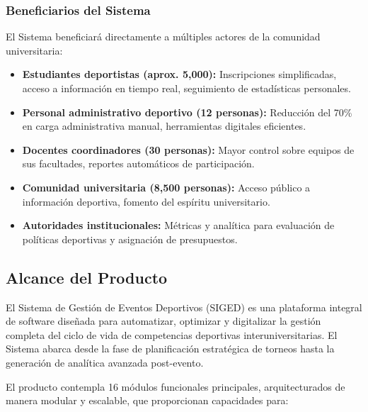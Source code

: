 \documentclass[12pt,a4paper]{article}
\begin{document}
\subsubsection{Beneficiarios del Sistema}

El Sistema beneficiará directamente a múltiples actores de la comunidad universitaria:

\begin{itemize}[noitemsep]
    \item \textbf{Estudiantes deportistas (aprox. 5,000):} Inscripciones simplificadas, acceso a información en tiempo real, seguimiento de estadísticas personales.
    \item \textbf{Personal administrativo deportivo (12 personas):} Reducción del 70\% en carga administrativa manual, herramientas digitales eficientes.
    \item \textbf{Docentes coordinadores (30 personas):} Mayor control sobre equipos de sus facultades, reportes automáticos de participación.
    \item \textbf{Comunidad universitaria (8,500 personas):} Acceso público a información deportiva, fomento del espíritu universitario.
    \item \textbf{Autoridades institucionales:} Métricas y analítica para evaluación de políticas deportivas y asignación de presupuestos.
\end{itemize}

\subsection{Alcance del Producto}

El Sistema de Gestión de Eventos Deportivos (SIGED) es una plataforma integral de software diseñada para automatizar, optimizar y digitalizar la gestión completa del ciclo de vida de competencias deportivas interuniversitarias. El Sistema abarca desde la fase de planificación estratégica de torneos hasta la generación de analítica avanzada post-evento.

El producto contempla 16 módulos funcionales principales, arquitecturados de manera modular y escalable, que proporcionan capacidades para:
\end{document}
